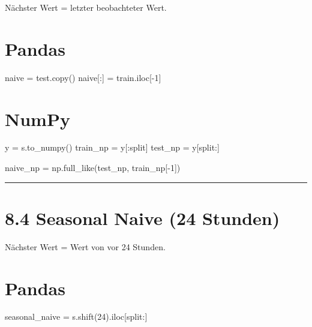 \documentclass[
  ngerman,
  letterpaper,
  DIV=11]{scrreprt}
\newenvironment{Shaded}{\begin{snugshade}}{\end{snugshade}}
\newcommand{\DecValTok}[1]{\textcolor[rgb]{0.68,0.00,0.00}{#1}}
\newcommand{\NormalTok}[1]{\textcolor[rgb]{0.00,0.23,0.31}{#1}}
\newcommand{\OperatorTok}[1]{\textcolor[rgb]{0.37,0.37,0.37}{#1}}
\begin{document}
Nächster Wert = letzter beobachteter Wert.

\section{Pandas}

\begin{Shaded}
\begin{Highlighting}[]
\NormalTok{naive }\OperatorTok{=}\NormalTok{ test.copy()}
\NormalTok{naive[:] }\OperatorTok{=}\NormalTok{ train.iloc[}\OperatorTok{{-}}\DecValTok{1}\NormalTok{]}
\end{Highlighting}
\end{Shaded}

\section{NumPy}

\begin{Shaded}
\begin{Highlighting}[]
\NormalTok{y }\OperatorTok{=}\NormalTok{ s.to\_numpy()}
\NormalTok{train\_np }\OperatorTok{=}\NormalTok{ y[:split]}
\NormalTok{test\_np }\OperatorTok{=}\NormalTok{ y[split:]}

\NormalTok{naive\_np }\OperatorTok{=}\NormalTok{ np.full\_like(test\_np, train\_np[}\OperatorTok{{-}}\DecValTok{1}\NormalTok{])}
\end{Highlighting}
\end{Shaded}

\begin{center}\rule{0.5\linewidth}{0.5pt}\end{center}

\section{8.4 Seasonal Naive (24
Stunden)}\label{seasonal-naive-24-stunden}

Nächster Wert = Wert von vor 24 Stunden.

\section{Pandas}

\begin{Shaded}
\begin{Highlighting}[]
\NormalTok{seasonal\_naive }\OperatorTok{=}\NormalTok{ s.shift(}\DecValTok{24}\NormalTok{).iloc[split:]}
\end{Highlighting}
\end{Shaded}
\end{document}
